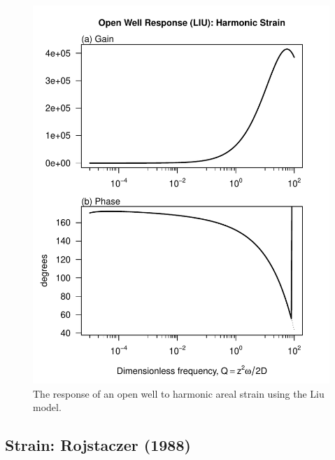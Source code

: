 \documentclass[10pt]{article}\usepackage[]{graphicx}\usepackage[]{color}
\makeatletter
\def\maxwidth{ %
  \ifdim\Gin@nat@width>\linewidth
    \linewidth
  \else
    \Gin@nat@width
  \fi
}
\newenvironment{knitrout}{}{} %
\makeatother
\begin{document}
\begin{figure}[htb!]
\begin{center}
\begin{knitrout}
\color{fgcolor}
\includegraphics[width=\maxwidth]{figure/LIURESPFIG} 

\end{knitrout}

\caption{The response of an open well to harmonic areal strain using
the Liu model. 
}
\label{fig:owrsp-liu}
\end{center}
\end{figure}

\subsection{Strain: Rojstaczer (1988)}
%
\citet{rojstaczer1988, rojstaczer1988b}
\end{document}
